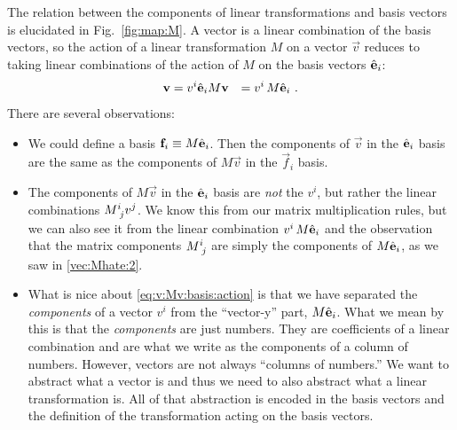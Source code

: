 \documentclass[12pt]{article}
\begin{document}
The relation between the components of linear transformations and basis vectors is elucidated in Fig.~\ref{fig:map:M}. A vector is a linear combination of the basis vectors, so the action of a linear transformation $M$ on a vector $\vec{v}$ reduces to taking linear combinations of the action of $M$ on the basis vectors $\hat{\mathbf{e}}_i$:
\begin{align}
    \mathbf{v} &= v^i\hat{\mathbf{e}}_i 
    M\mathbf{v} &= v^i\, M\hat{\mathbf{e}}_i 
    \ .
    \label{eq:v:Mv:basis:action}
\end{align}
There are several observations:
\begin{itemize}
    \item We could define a basis $\mathbf{f}_i \equiv M\hat{\mathbf{e}}_i$. Then the components of $\vec{v}$ in the $\hat{\mathbf{e}}_i$ basis are the same as the components of $M\vec{v}$ in the $\vec{f}_i$ basis. 
    \item The components of $M\vec{v}$ in the $\hat{\mathbf{e}}_i$ basis are \emph{not} the $v^i$, but rather the linear combinations $M\aij{i}{j}v^j$. We know this from our matrix multiplication rules, but we can also see it from the linear combination $v^i\, M\hat{\mathbf{e}}_i$ and the observation that the matrix components $M\aij{i}{j}$ are simply the components of $M\hat{\mathbf{e}}_i$, as we saw in \eqref{vec:Mhate:2}.
    \item What is nice about \eqref{eq:v:Mv:basis:action} is that we have separated the \emph{components} of a vector $v^i$ from the ``vector-y'' part, $M\hat{\mathbf{e}}_i$. What we mean by this is that the \emph{components} are just numbers. They are coefficients of a linear combination and are what we write as the components of a column of numbers. However, vectors are not always ``columns of numbers.'' We want to abstract what a vector is and thus we need to also abstract what a linear transformation is. All of that abstraction is encoded in the basis vectors and the definition of the transformation acting on the basis vectors. 
\end{itemize}
\end{document}
